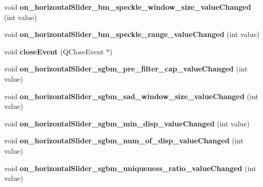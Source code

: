 \begin{DoxyCompactItemize}
\item 
\hypertarget{classstereo_match_param_form_a0a321f9430961264f75b6aa87f5e0573}{}void {\bfseries on\+\_\+horizontal\+Slider\+\_\+bm\+\_\+speckle\+\_\+window\+\_\+size\+\_\+value\+Changed} (int value)\label{classstereo_match_param_form_a0a321f9430961264f75b6aa87f5e0573}

\item 
\hypertarget{classstereo_match_param_form_a8fadcdd62022a5f1ff7e3873539d72ad}{}void {\bfseries on\+\_\+horizontal\+Slider\+\_\+bm\+\_\+speckle\+\_\+range\+\_\+value\+Changed} (int value)\label{classstereo_match_param_form_a8fadcdd62022a5f1ff7e3873539d72ad}

\item 
\hypertarget{classstereo_match_param_form_a2bb282b6a280ec76394205a349a966b0}{}void {\bfseries close\+Event} (Q\+Close\+Event $\ast$)\label{classstereo_match_param_form_a2bb282b6a280ec76394205a349a966b0}

\item 
\hypertarget{classstereo_match_param_form_a7f9028514c2576f8a8b7e4949de90f80}{}void {\bfseries on\+\_\+horizontal\+Slider\+\_\+sgbm\+\_\+pre\+\_\+filter\+\_\+cap\+\_\+value\+Changed} (int value)\label{classstereo_match_param_form_a7f9028514c2576f8a8b7e4949de90f80}

\item 
\hypertarget{classstereo_match_param_form_a3130e45c523de78d2256a3ee64b6cd41}{}void {\bfseries on\+\_\+horizontal\+Slider\+\_\+sgbm\+\_\+sad\+\_\+window\+\_\+size\+\_\+value\+Changed} (int value)\label{classstereo_match_param_form_a3130e45c523de78d2256a3ee64b6cd41}

\item 
\hypertarget{classstereo_match_param_form_a9a1f75337638bd4ba03e3908408ce66e}{}void {\bfseries on\+\_\+horizontal\+Slider\+\_\+sgbm\+\_\+min\+\_\+disp\+\_\+value\+Changed} (int value)\label{classstereo_match_param_form_a9a1f75337638bd4ba03e3908408ce66e}

\item 
\hypertarget{classstereo_match_param_form_acbf080edaba841fc5adfb04ffb8ae8fa}{}void {\bfseries on\+\_\+horizontal\+Slider\+\_\+sgbm\+\_\+num\+\_\+of\+\_\+disp\+\_\+value\+Changed} (int value)\label{classstereo_match_param_form_acbf080edaba841fc5adfb04ffb8ae8fa}

\item 
\hypertarget{classstereo_match_param_form_aea726b9a1a255116db326de7f8b1f847}{}void {\bfseries on\+\_\+horizontal\+Slider\+\_\+sgbm\+\_\+uniqueness\+\_\+ratio\+\_\+value\+Changed} (int value)\label{classstereo_match_param_form_aea726b9a1a255116db326de7f8b1f847}


\end{DoxyCompactItemize}
